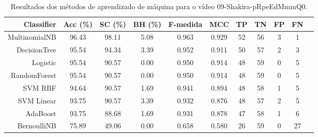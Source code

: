 \begin{table}[!htb]
\centering
\caption{Resultados dos métodos de aprendizado de máquina para o vídeo 09-Shakira-pRpeEdMmmQ0.}
\label{tab:09-Shakira-pRpeEdMmmQ0}
\begin{tabular}{r|c|c|c|c|c|c|c|c|c|c}
\hline\hline
Classifier & Acc (\%) & SC (\%) & BH (\%) & F-medida & MCC & TP & TN & FP & FN \\ \hline
MultinomialNB & 96.43 & 98.11 & 5.08 & 0.963 & 0.929 & 52 & 56 & 3 & 1 \\ 
DecisionTree & 95.54 & 94.34 & 3.39 & 0.952 & 0.911 & 50 & 57 & 2 & 3 \\ 
Logistic & 95.54 & 90.57 & 0.00 & 0.950 & 0.914 & 48 & 59 & 0 & 5 \\ 
RandomForest & 95.54 & 90.57 & 0.00 & 0.950 & 0.914 & 48 & 59 & 0 & 5 \\ 
SVM RBF & 94.64 & 90.57 & 1.69 & 0.941 & 0.894 & 48 & 58 & 1 & 5 \\ 
SVM Linear & 93.75 & 90.57 & 3.39 & 0.932 & 0.876 & 48 & 57 & 2 & 5 \\ 
AdaBoost & 93.75 & 88.68 & 1.69 & 0.931 & 0.878 & 47 & 58 & 1 & 6 \\ 
BernoulliNB & 75.89 & 49.06 & 0.00 & 0.658 & 0.580 & 26 & 59 & 0 & 27 \\ 
\hline\hline
\end{tabular}
\end{table}
